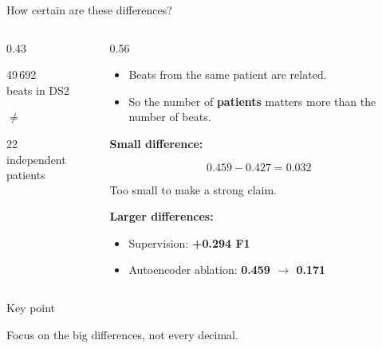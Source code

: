 \documentclass[aspectratio=169,10pt]{beamer}
\newcommand{\keypoint}[1]{%
  \vspace{0.4em}
  \begin{alertblock}{Key point}
    #1
  \end{alertblock}
}
\begin{document}
\begin{frame}{How certain are these differences?}

  \begin{columns}[T]

    \begin{column}{0.43\textwidth}
      \centering

      \Huge 49\,692\\
      \normalsize beats in DS2

      \vspace{1em}

      \Huge $\neq$

      \vspace{1em}

      \Huge \alert{22}\\
      \normalsize independent patients
    \end{column}

  \begin{column}{0.56\textwidth}

    \begin{itemize}
      \item Beats from the same patient are related.
      \item So the number of \textbf{patients} matters more than the number of beats.
    \end{itemize}

    \vspace{0.5em}

    \textbf{Small difference:}

    \[
      0.459 - 0.427 = 0.032
    \]

    \centering
    Too small to make a strong claim.

    \vspace{0.8em}

    \raggedright
    \textbf{Larger differences:}
    \begin{itemize}
      \item Supervision: \textbf{+0.294 F1}
      \item Autoencoder ablation: \textbf{0.459 $\rightarrow$ 0.171}
    \end{itemize}

  \end{column}

  \end{columns}

  \keypoint{
    \vspace{0.1cm}
    Focus on the big differences, not every decimal.}

\end{frame}
\end{document}
